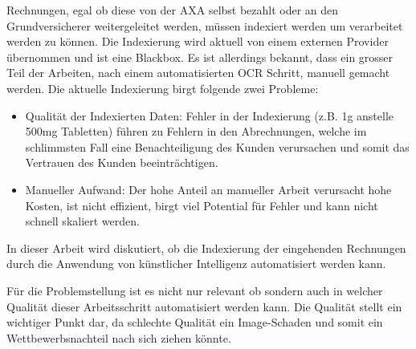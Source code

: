 \documentclass{hwz}
\begin{document}
Rechnungen, egal ob diese von der AXA selbst bezahlt oder an den Grundversicherer weitergeleitet werden, müssen indexiert werden um verarbeitet werden zu können. Die Indexierung wird aktuell von einem externen Provider übernommen und ist eine Blackbox. Es ist allerdings bekannt, dass ein grosser Teil der Arbeiten, nach einem automatisierten OCR Schritt, manuell gemacht werden. Die aktuelle Indexierung birgt folgende zwei Probleme:



\begin{itemize}
    \item Qualität der Indexierten Daten: Fehler in der Indexierung (z.B. 1g anstelle 500mg Tabletten) führen zu Fehlern in den Abrechnungen, welche im schlimmsten Fall eine Benachteiligung des Kunden verursachen und somit das Vertrauen des Kunden beeinträchtigen.
    \item Manueller Aufwand: Der hohe Anteil an manueller Arbeit verursacht hohe Kosten, ist nicht effizient, birgt viel Potential für Fehler und kann nicht schnell skaliert werden.
\end{itemize}


In dieser Arbeit wird diskutiert, ob die Indexierung der eingehenden Rechnungen durch die Anwendung von künstlicher Intelligenz automatisiert werden kann.

Für die Problemstellung ist es nicht nur relevant ob sondern auch in welcher Qualität dieser Arbeitsschritt automatisiert werden kann. Die Qualität stellt ein wichtiger Punkt dar, da schlechte Qualität ein Image-Schaden und somit ein Wettbewerbsnachteil nach sich ziehen könnte.
\end{document}
